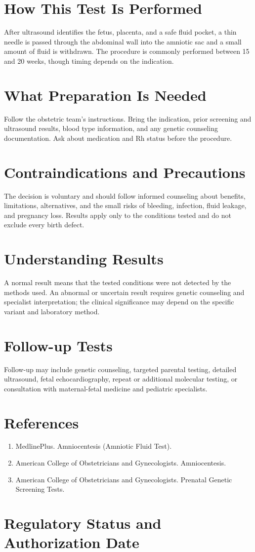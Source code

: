 \section*{How This Test Is Performed}
After ultrasound identifies the fetus, placenta, and a safe fluid pocket, a thin needle is passed through the abdominal wall into the amniotic sac and a small amount of fluid is withdrawn. The procedure is commonly performed between 15 and 20 weeks, though timing depends on the indication.

\section*{What Preparation Is Needed}
Follow the obstetric team's instructions. Bring the indication, prior screening and ultrasound results, blood type information, and any genetic counseling documentation. Ask about medication and Rh status before the procedure.

\section*{Contraindications and Precautions}
The decision is voluntary and should follow informed counseling about benefits, limitations, alternatives, and the small risks of bleeding, infection, fluid leakage, and pregnancy loss. Results apply only to the conditions tested and do not exclude every birth defect.

\section*{Understanding Results}
A normal result means that the tested conditions were not detected by the methods used. An abnormal or uncertain result requires genetic counseling and specialist interpretation; the clinical significance may depend on the specific variant and laboratory method.

\section*{Follow-up Tests}
Follow-up may include genetic counseling, targeted parental testing, detailed ultrasound, fetal echocardiography, repeat or additional molecular testing, or consultation with maternal-fetal medicine and pediatric specialists.

\section*{References}
\begin{enumerate}
  \item MedlinePlus. Amniocentesis (Amniotic Fluid Test).
  \item American College of Obstetricians and Gynecologists. Amniocentesis.
  \item American College of Obstetricians and Gynecologists. Prenatal Genetic Screening Tests.
\end{enumerate}

\clearpage


\section*{Regulatory Status and Authorization Date}

\clearpage
